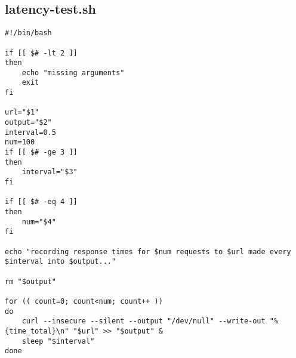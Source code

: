 \documentclass{article}
\begin{document}
\subsection{latency-test.sh}
\begin{verbatim}
#!/bin/bash

if [[ $# -lt 2 ]]
then
    echo "missing arguments"
    exit
fi

url="$1"
output="$2"
interval=0.5
num=100
if [[ $# -ge 3 ]]
then
    interval="$3"
fi

if [[ $# -eq 4 ]]
then
    num="$4"
fi

echo "recording response times for $num requests to $url made every $interval into $output..."

rm "$output"

for (( count=0; count<num; count++ ))
do
    curl --insecure --silent --output "/dev/null" --write-out "%{time_total}\n" "$url" >> "$output" &
    sleep "$interval"
done

\end{verbatim}
\end{document}

